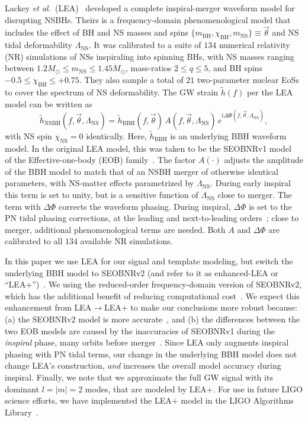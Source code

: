 \documentclass[aps,prd,amsmath,floats,floatfix, twocolumn,
superscriptaddress,nofootinbib,showpacs]{revtex4-1}
\newcommand{\lambdans}{\Lambda_\mathrm{NS}}
\newcommand{\ii}{\mathrm{i}}
\newcommand{\chibh}{\chi_\mathrm{BH}}
\newcommand{\chins}{\chi_\mathrm{NS}}
\newcommand{\mbh}{m_\mathrm{BH}}
\newcommand{\mns}{m_\mathrm{NS}}
\begin{document}
Lackey {\it et al.}~(LEA)~\cite{Lackey:2013axa} developed a complete inspiral-merger
waveform model for disrupting NSBHs. Theirs is a frequency-domain
phenomenological model that includes the effect of BH and NS masses and spins
$\{\mbh, \chibh, \mns\}\equiv\vec{\theta}$ and NS tidal deformability
$\lambdans$. It was calibrated to a suite of $134$ numerical relativity (NR)
simulations of NSs inspiraling into spinning BHs, with
NS masses ranging between $1.2M_\odot\leq\mns\leq 1.45M_\odot$,
mass-ratios $2\leq q\leq 5$, and BH spins $-0.5\leq\chibh\leq+0.75$.
They also sample a total of $21$ two-parameter nuclear EoSs to cover the
spectrum of NS deformability.
% 
% 
The GW strain $\tilde{h}(f)$ per the LEA model can be written as
\begin{equation}
 \tilde{h}_\mathrm{NSBH}(f, \vec{\theta}, \lambdans) = \tilde{h}_\mathrm{BBH}(f, \vec{\theta})\,A(f, \vec{\theta}, \lambdans)\,e^{\ii \Delta\Phi(f, \vec{\theta}, \lambdans)},
\end{equation}
with NS spin $\chins=0$ identically. Here, $\tilde{h}_\mathrm{BBH}$ is
an underlying BBH waveform model. In the original LEA model,
this was taken to be the SEOBNRv1
model~\cite{Taracchini:2012} of the Effective-one-body (EOB)
family~\cite{Buonanno99}. The factor $A(\cdot)$ adjusts
the amplitude of the BBH model to match that of an NSBH merger of otherwise
identical parameters, with NS-matter effects parametrized by $\lambdans$.
During early inspiral this term is set to
unity, but is a sensitive function of $\lambdans$ close to merger. The term with
$\Delta\Phi$ corrects the waveform phasing. During inspiral,
$\Delta\Phi$ is set to the PN tidal phasing corrections,
at the leading and next-to-leading orders~\cite{Vines2011}; close to merger,
additional phenomenological terms are needed. Both $A$ and $\Delta\Phi$ are
calibrated to all $134$ available NR simulations.


In this paper we use LEA for our signal and template modeling, but switch the 
underlying BBH model to SEOBNRv2 (and refer to it as enhanced-LEA or
``LEA+'')~\cite{Taracchini:2013rva}. We using the reduced-order
frequency-domain version of SEOBNRv2, which has the additional benefit of
reducing computational cost~\cite{Purrer:2015tud}. We expect this enhancement
from LEA$\rightarrow$LEA+ to make our conclusions more robust because: (a) the 
SEOBNRv2 model is more accurate~\cite{Kumar:2015tha,Kumar:2016dhh}, and (b)
the differences between the two EOB models are caused by the
inaccuracies of SEOBNRv1 during the {\it inspiral} phase, many orbits before 
merger~\cite{Kumar:2015tha}.
Since LEA only augments inspiral phasing with PN tidal terms, our
change in the underlying BBH model does not change LEA's construction, {\it and}
increases the overall model accuracy during inspiral.
% 
Finally, we note that we approximate the full GW signal with its dominant
$l=|m|=2$ modes, that are modeled by LEA+. For use in future LIGO science
efforts, we have implemented the LEA+ model in the LIGO Algorithms
Library~\cite{LAL}.
\end{document}
